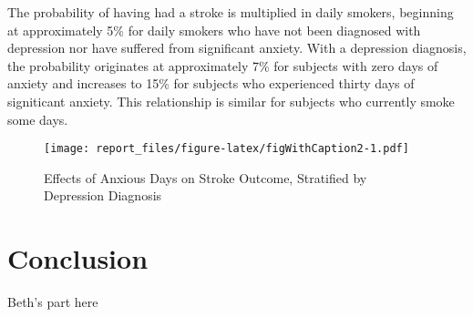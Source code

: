 \documentclass[11pt,]{article}
\begin{document}
The probability of having had a stroke is multiplied in daily smokers,
beginning at approximately 5\% for daily smokers who have not been
diagnosed with depression nor have suffered from significant anxiety.
With a depression diagnosis, the probability originates at approximately
7\% for subjects with zero days of anxiety and increases to 15\% for
subjects who experienced thirty days of signiticant anxiety. This
relationship is similar for subjects who currently smoke some days.

\begin{figure}
\centering
\texttt{[image: report\_files/figure-latex/figWithCaption2-1.pdf]}
\caption{Effects of Anxious Days on Stroke Outcome, Stratified by
Depression Diagnosis}
\end{figure}

\section{Conclusion}\label{conclusion}

Beth's part here




\newpage
\singlespacing 

\end{document}
